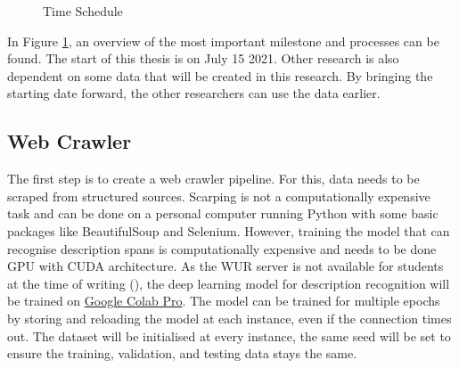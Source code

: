 \documentclass[a4paper, 12pt, oneside]{book} %
\begin{document}
\begin{figure} [t]
    \centering
    \vspace{-2cm}
    \hspace{-1.3cm}
    \caption{Time Schedule}
    \label{fig:time_schedule}
\end{figure}

In Figure \ref{fig:time_schedule}, an overview of the most important milestone and processes can be found.
The start of this thesis is on July 15 2021.
Other research is also dependent on some data that will be created in this research.
By bringing the starting date forward, the other researchers can use the data earlier.


\subsection{Web Crawler}
The first step is to create a web crawler pipeline. 
For this, data needs to be scraped from structured sources.
Scarping is not a computationally expensive task and can be done on a personal computer running Python with some basic packages like BeautifulSoup and Selenium.
However, training the model that can recognise description spans is computationally expensive and needs to be done GPU with CUDA architecture.
As the WUR server is not available for students at the time of writing (\thedate), the deep learning model for description recognition will be trained on \href{https://colab.research.google.com/}{Google Colab Pro}. 
The model can be trained for multiple epochs by storing and reloading the model at each instance, even if the connection times out.
The dataset will be initialised at every instance, the same seed will be set to ensure the training, validation, and testing data stays the same.
\end{document}
